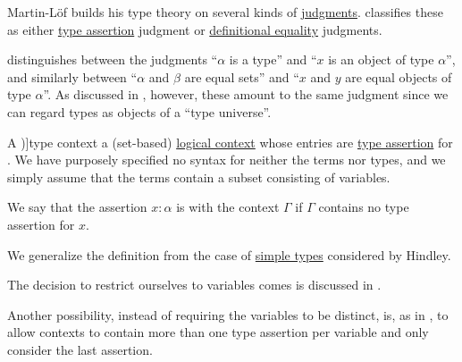 \begin{remark}\label{rem:typing_judgments}
  Martin-L\"of builds his type theory on several kinds of \hyperref[con:judgment]{judgments}. \cite[19]{UnivalentProject2024OctoberHoTT} classifies these as either \hyperref[def:type_assertion]{type assertion} judgment or \hyperref[con:definitional_equality]{definitional equality} judgments.

   distinguishes between the judgments \enquote{\( \alpha \) is a type} and \enquote{\( x \) is an object of type \( \alpha \)}, and similarly between \enquote{\( \alpha \) and \( \beta \) are equal sets} and \enquote{\( x \) and \( y \) are equal objects of type \( \alpha \)}. As discussed in , however, these amount to the same judgment since we can regard types as objects of a \enquote{type universe}.
\end{remark}

\begin{definition}\label{def:type_context}
  A \term[en=type-context (\cite[def. 2A5]{Hindley1997STT})]{type context} a (set-based) \hyperref[def:logical_context]{logical context} whose entries are \hyperref[def:type_assertion]{type assertion} for . We have purposely specified no syntax for neither the terms nor types, and we simply assume that the terms contain a subset consisting of variables.

  We say that the assertion \( x: \alpha \) is  with the context \( \Gamma \) if \( \Gamma \) contains no type assertion for \( x \).
\end{definition}
\begin{comments}
  \item We generalize the definition from the case of \hyperref[def:simple_type]{simple types} considered by Hindley.

  \item The decision to restrict ourselves to variables comes is discussed in .

  \item Another possibility, instead of requiring the variables to be distinct, is, as in \cite[159]{Mimram2020Types}, to allow contexts to contain more than one type assertion per variable and only consider the last assertion.
\end{comments}

